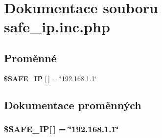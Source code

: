 \section{Dokumentace souboru safe\_\-ip.inc.php}
\label{safe__ip_8inc_8php}
\subsection*{Proměnné}
\begin{CompactItemize}
\item 
{\bf \$SAFE\_\-IP} [$\,$] = \char`\"{}192.168.1.1\char`\"{}
\end{CompactItemize}


\subsection{Dokumentace proměnných}
\subsubsection{\setlength{\rightskip}{0pt plus 5cm}\$SAFE\_\-IP[$\,$] = \char`\"{}192.168.1.1\char`\"{}}\label{safe__ip_8inc_8php_579999e93b82d5cfe82e6716021e0324}


